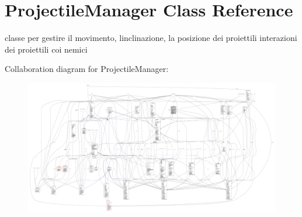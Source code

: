 \hypertarget{classmanagers_1_1_projectile_manager}{}\section{Projectile\+Manager Class Reference}
\label{classmanagers_1_1_projectile_manager}


classe per gestire il movimento, l\textquotesingle{}inclinazione, la posizione dei proiettili interazioni dei proiettili coi nemici  




Collaboration diagram for Projectile\+Manager\+:
\nopagebreak
\begin{figure}[H]
\begin{center}
\leavevmode
\includegraphics[width=350pt]{classmanagers_1_1_projectile_manager__coll__graph}
\end{center}
\end{figure}

